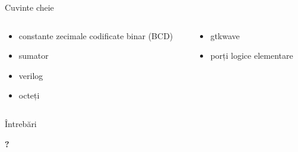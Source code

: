 \documentclass{beamer}
\begin{document}
\begin{frame}{Cuvinte cheie}
\begin{columns}[T] %
\begin{column}{.48\textwidth}


\begin{itemize}
\setlength\itemsep{1.5em}
  \item constante zecimale codificate binar (BCD)
  \item sumator
  \item verilog
  \item octeți
\end{itemize}

\end{column}%
\hfill%
\begin{column}{.48\textwidth}
\begin{itemize}
\setlength\itemsep{1.5em}
  \item gtkwave
  \item porți logice elementare
\end{itemize}

\end{column}%
\end{columns}
\end{frame}

\begin{frame}{Întrebări}
  \begin{center}
    \bfseries
    \Huge
    ?
  \end{center}
\end{frame}
\end{document}

